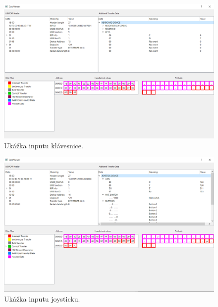 \begin{figure}[!htb]
	\centering
	\includegraphics[width=\textwidth]{img/kap06_uk_keyboard}
	\caption{Ukážka inputu klávesnice.}
	\label{obr:kap6:uk_input_keyboard}
\end{figure}

\begin{figure}[!htb]
	\centering
	\includegraphics[width=\textwidth]{img/kap06_uk_joystick}
	\caption{Ukážka inputu joysticku.}
	\label{obr:kap6:uk_input_joystick}
\end{figure}